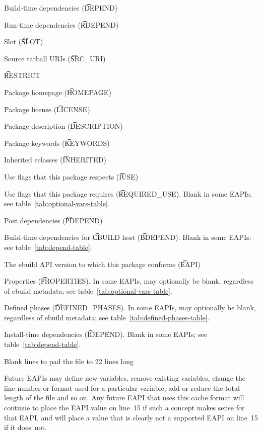 \begin{compactenum}
\item Build-time dependencies (\t{DEPEND})
\item Run-time dependencies (\t{RDEPEND})
\item Slot (\t{SLOT})
\item Source tarball URIs (\t{SRC_URI})
\item \t{RESTRICT}
\item Package homepage (\t{HOMEPAGE})
\item Package license (\t{LICENSE})
\item Package description (\t{DESCRIPTION})
\item Package keywords (\t{KEYWORDS})
\item Inherited eclasses (\t{INHERITED})
\item Use flags that this package respects (\t{IUSE})
\item Use flags that this package requires (\t{REQUIRED_USE}).
    Blank in some EAPIs; see table~\ref{tab:optional-vars-table}.
\item Post dependencies (\t{PDEPEND})
\item Build-time dependencies for \t{CBUILD} host (\t{BDEPEND}).
    Blank in some EAPIs; see table~\ref{tab:depend-table}.
\item The ebuild API version to which this package conforms (\t{EAPI})
\item Properties (\t{PROPERTIES}). In some EAPIs, may optionally be blank, regardless of ebuild
    metadata; see table~\ref{tab:optional-vars-table}.
\item Defined phases (\t{DEFINED_PHASES}). In some EAPIs, may optionally be blank, regardless of
    ebuild metadata; see table~\ref{tab:defined-phases-table}.
\item Install-time dependencies (\t{IDEPEND}).
    Blank in some EAPIs; see table~\ref{tab:depend-table}.
\item Blank lines to pad the file to 22 lines long
\end{compactenum}

Future EAPIs may define new variables, remove existing variables, change the line number or
format used for a particular variable, add or reduce the total length of the file and so on.
Any future EAPI that uses this cache format will continue to place the EAPI value on line~15 if
such a concept makes sense for that EAPI, and will place a value that is clearly not a supported
EAPI on line~15 if it does~not.

